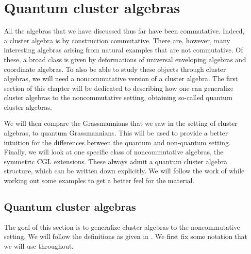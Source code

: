 \newcommand{\bbr}{\mathbf{r}}
\newcommand{\bbt}{\mathbf{t}}
\newcommand{\bbq}{\mathbf{q}}
\newcommand{\bbn}{\boldsymbol{\nu}}
\newcommand{\bbl}{\boldsymbol{\lambda}}
\newcommand{\bbg}{\boldsymbol{\gamma}}
\newcommand{\oy}{\overline{y}}
\renewcommand{\oe}{\overline{e}}
\newcommand{\epsbullet}{e_{p(k_\bullet)} + e_{s(k_\bullet)}}
\newcommand{\ekbullet}{e_{k_\bullet}}
\newcommand{\HeisUqn}{\Heis(\mcU_q(\mfn_2))}

\chapter{Quantum cluster algebras}
All the algebras that we have discussed thus far have been commutative. Indeed, a
cluster algebra is by construction commutative. There are, however, many interesting
algebras arising from natural examples that are not commutative. Of these, a broad
class is given by deformations of universal enveloping algebras and coordinate
algebras. To also be able to study these objects through cluster algebras, we will need
a noncommutative version of a cluster algebra. The first section of this chapter will
be dedicated to describing how one can generalize cluster algebras to the
noncommutative setting, obtaining so-called quantum cluster algebras.

We will then compare the Grassmannians that we saw in the setting of cluster algebras,
to quantum Grassmannians. This will be used to provide a better intuition for the
differences between the quantum and non-quantum setting. Finally, we will look at one
specific class of noncommutative algebras, the symmetric CGL extensions. These always
admit a quantum cluster algebra structure, which can be written down explicitly. We
will follow the work of \cite{GoodearlYakimov2017QCA} while working out some examples
to get a better feel for the material.

\section{Quantum cluster algebras}

The goal of this section is to generalize cluster algebras to the noncommutative
setting. We will follow the definitions as given in \cite{GoodearlYakimov2017QCA}. We
first fix some notation that we will use throughout.

